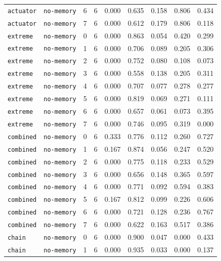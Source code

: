 \documentclass{article}
\begin{document}
\begin{center}
\begin{tabular}{lllcccccc}
\texttt{actuator} & \texttt{no-memory} & 6 & 6 & 0.000 & 0.635 & 0.158 & 0.806 & 0.434 \\
\texttt{actuator} & \texttt{no-memory} & 7 & 6 & 0.000 & 0.612 & 0.179 & 0.806 & 0.118 \\
\texttt{extreme} & \texttt{no-memory} & 0 & 6 & 0.000 & 0.863 & 0.054 & 0.420 & 0.299 \\
\texttt{extreme} & \texttt{no-memory} & 1 & 6 & 0.000 & 0.706 & 0.089 & 0.205 & 0.306 \\
\texttt{extreme} & \texttt{no-memory} & 2 & 6 & 0.000 & 0.752 & 0.080 & 0.108 & 0.073 \\
\texttt{extreme} & \texttt{no-memory} & 3 & 6 & 0.000 & 0.558 & 0.138 & 0.205 & 0.311 \\
\texttt{extreme} & \texttt{no-memory} & 4 & 6 & 0.000 & 0.707 & 0.077 & 0.278 & 0.277 \\
\texttt{extreme} & \texttt{no-memory} & 5 & 6 & 0.000 & 0.819 & 0.069 & 0.271 & 0.111 \\
\texttt{extreme} & \texttt{no-memory} & 6 & 6 & 0.000 & 0.657 & 0.061 & 0.073 & 0.395 \\
\texttt{extreme} & \texttt{no-memory} & 7 & 6 & 0.000 & 0.746 & 0.095 & 0.319 & 0.000 \\
\texttt{combined} & \texttt{no-memory} & 0 & 6 & 0.333 & 0.776 & 0.112 & 0.260 & 0.727 \\
\texttt{combined} & \texttt{no-memory} & 1 & 6 & 0.167 & 0.874 & 0.056 & 0.247 & 0.520 \\
\texttt{combined} & \texttt{no-memory} & 2 & 6 & 0.000 & 0.775 & 0.118 & 0.233 & 0.529 \\
\texttt{combined} & \texttt{no-memory} & 3 & 6 & 0.000 & 0.656 & 0.148 & 0.365 & 0.597 \\
\texttt{combined} & \texttt{no-memory} & 4 & 6 & 0.000 & 0.771 & 0.092 & 0.594 & 0.383 \\
\texttt{combined} & \texttt{no-memory} & 5 & 6 & 0.167 & 0.812 & 0.099 & 0.226 & 0.606 \\
\texttt{combined} & \texttt{no-memory} & 6 & 6 & 0.000 & 0.721 & 0.128 & 0.236 & 0.767 \\
\texttt{combined} & \texttt{no-memory} & 7 & 6 & 0.000 & 0.622 & 0.163 & 0.517 & 0.386 \\
\texttt{chain} & \texttt{no-memory} & 0 & 6 & 0.000 & 0.900 & 0.047 & 0.000 & 0.433 \\
\texttt{chain} & \texttt{no-memory} & 1 & 6 & 0.000 & 0.935 & 0.033 & 0.000 & 0.137 \\
\bottomrule
\end{tabular}
\end{center}
\end{document}
